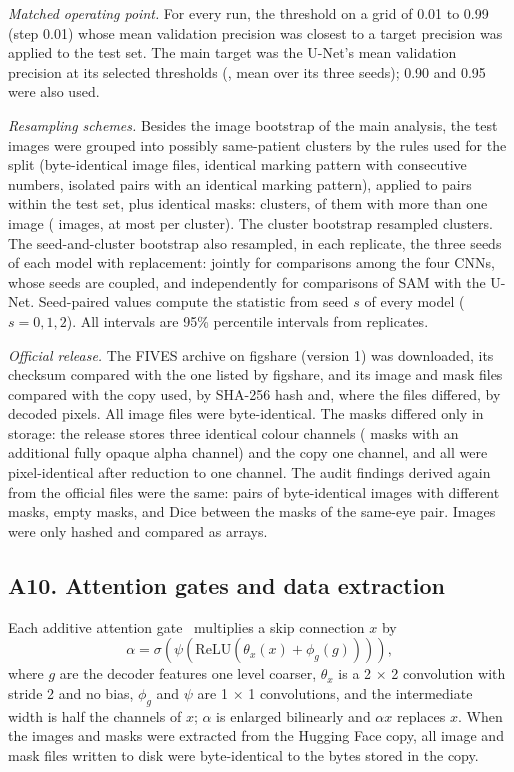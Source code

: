 \textit{Matched operating point.} For every run, the threshold on a grid of 0.01 to 0.99 (step 0.01) whose mean
validation precision was closest to a target precision was applied to the test set. The main target was the U-Net's mean
validation precision at its selected thresholds (\PHMatchTarget, mean over its three seeds); 0.90 and 0.95 were also used.

\textit{Resampling schemes.} Besides the image bootstrap of the main analysis, the test images were grouped into
possibly same-patient clusters by the rules used for the split (byte-identical image files, identical marking pattern with
consecutive numbers, isolated pairs with an identical marking pattern), applied to pairs within the test set, plus
identical masks: \PHNClusters{} clusters, \PHNMultiClusters{} of them with more than one image (\PHNClusteredImages{}
images, at most \PHLargestCluster{} per cluster). The cluster bootstrap resampled clusters. The seed-and-cluster bootstrap
also resampled, in each replicate, the three seeds of each model with replacement: jointly for comparisons among the four
CNNs, whose seeds are coupled, and independently for comparisons of SAM with the U-Net. Seed-paired values compute the
statistic from seed $s$ of every model ($s = 0, 1, 2$). All intervals are 95\% percentile intervals from \PHNBoot{}
replicates.

\textit{Official release.} The FIVES archive on figshare (version 1) was downloaded, its checksum compared with the one
listed by figshare, and its \OffNPng{} image and mask files compared with the copy used, by SHA-256 hash and, where the
files differed, by decoded pixels. All \OffBytesEqualImg{} image files were byte-identical. The masks differed only in
storage: the release stores three identical colour channels (\OffPixEqualMaskRGBA{} masks with an additional fully opaque
alpha channel) and the copy one channel, and all \OffPixEqualMask{} were pixel-identical after reduction to one channel.
The audit findings derived again from the official files were the same: \OffNDupGroups{} pairs of byte-identical images
with different masks, \OffNEmptyMasks{} empty masks, and Dice \OffSameEyeDice{} between the masks of the same-eye pair.
Images were only hashed and compared as arrays.

\subsection*{A10. Attention gates and data extraction}
Each additive attention gate~\cite{oktay2018attention} multiplies a skip connection $x$ by
\begin{equation}
\alpha = \sigma\left(\psi\left(\mathrm{ReLU}\left(\theta_x(x) + \phi_g(g)\right)\right)\right),
\end{equation}
where $g$ are the decoder features one level coarser, $\theta_x$ is a 2 $\times$ 2 convolution with stride 2 and no bias,
$\phi_g$ and $\psi$ are 1 $\times$ 1 convolutions, and the intermediate width is half the channels of $x$; $\alpha$ is
enlarged bilinearly and $\alpha x$ replaces $x$. When the images and masks were extracted from the Hugging Face copy, all
\NImages{} image and mask files written to disk were byte-identical to the bytes stored in the copy.
